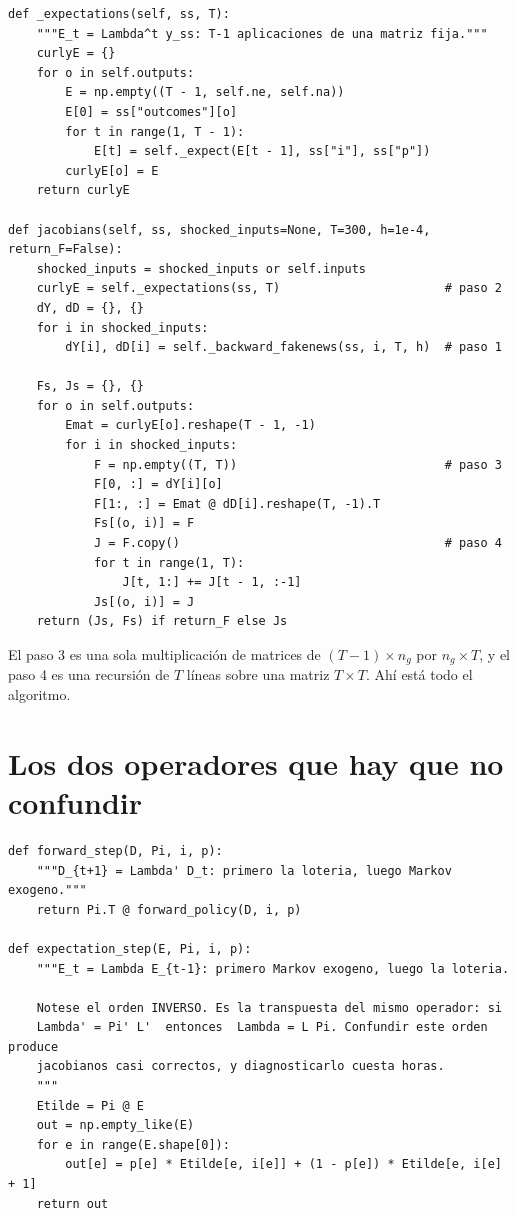 \begin{lstlisting}
def _expectations(self, ss, T):
    """E_t = Lambda^t y_ss: T-1 aplicaciones de una matriz fija."""
    curlyE = {}
    for o in self.outputs:
        E = np.empty((T - 1, self.ne, self.na))
        E[0] = ss["outcomes"][o]
        for t in range(1, T - 1):
            E[t] = self._expect(E[t - 1], ss["i"], ss["p"])
        curlyE[o] = E
    return curlyE

def jacobians(self, ss, shocked_inputs=None, T=300, h=1e-4, return_F=False):
    shocked_inputs = shocked_inputs or self.inputs
    curlyE = self._expectations(ss, T)                       # paso 2
    dY, dD = {}, {}
    for i in shocked_inputs:
        dY[i], dD[i] = self._backward_fakenews(ss, i, T, h)  # paso 1

    Fs, Js = {}, {}
    for o in self.outputs:
        Emat = curlyE[o].reshape(T - 1, -1)
        for i in shocked_inputs:
            F = np.empty((T, T))                             # paso 3
            F[0, :] = dY[i][o]
            F[1:, :] = Emat @ dD[i].reshape(T, -1).T
            Fs[(o, i)] = F
            J = F.copy()                                     # paso 4
            for t in range(1, T):
                J[t, 1:] += J[t - 1, :-1]
            Js[(o, i)] = J
    return (Js, Fs) if return_F else Js
\end{lstlisting}

El paso 3 es una sola multiplicación de matrices de $(T-1)\times n_g$ por
$n_g\times T$, y el paso 4 es una recursión de $T$ líneas sobre una matriz
$T\times T$. Ahí está todo el algoritmo.

\section{Los dos operadores que hay que no confundir}

\begin{lstlisting}
def forward_step(D, Pi, i, p):
    """D_{t+1} = Lambda' D_t: primero la loteria, luego Markov exogeno."""
    return Pi.T @ forward_policy(D, i, p)

def expectation_step(E, Pi, i, p):
    """E_t = Lambda E_{t-1}: primero Markov exogeno, luego la loteria.

    Notese el orden INVERSO. Es la transpuesta del mismo operador: si
    Lambda' = Pi' L'  entonces  Lambda = L Pi. Confundir este orden produce
    jacobianos casi correctos, y diagnosticarlo cuesta horas.
    """
    Etilde = Pi @ E
    out = np.empty_like(E)
    for e in range(E.shape[0]):
        out[e] = p[e] * Etilde[e, i[e]] + (1 - p[e]) * Etilde[e, i[e] + 1]
    return out
\end{lstlisting}


